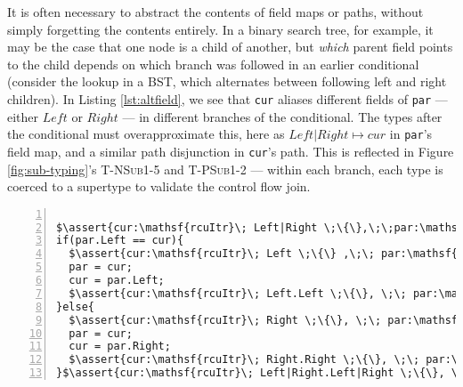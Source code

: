 It is often necessary to abstract the contents of field maps or paths, without simply forgetting the contents entirely.  In a binary search tree, for example, it may be the case that one node is a child of another, but \emph{which} parent field points to the child depends on which branch was followed in an earlier conditional (consider the lookup in a BST, which alternates between following left and right children).
In Listing \ref{lst:altfield}, we see that \texttt{cur} aliases different fields of \texttt{par} --- either $Left$ or $Right$ --- in different branches of the conditional.
The types after the conditional must overapproximate this, here as $Left|Right\mapsto cur$ in \texttt{par}'s field map, and a similar path disjunction in \texttt{cur}'s path.
This is reflected in Figure \ref{fig:sub-typing}'s \textsc{T-NSub1-5} and \textsc{T-PSub1-2} --- within each branch, each type is coerced to a supertype to validate the control flow join.
\begin{lstlisting}[caption={Choosing fields to read},label={lst:altfield},numbersep=1pt,xrightmargin=-1cm,xleftmargin=0.7em, numbers=left, numbersep=5pt,basicstyle=\scriptsize\ttfamily]%, ]

$\assert{cur:\mathsf{rcuItr}\; Left|Right \;\{\},\;\;par:\mathsf{rcuItr}\;  \epsilon \;\{Left|Right\mapsto cur\}}$
if(par.Left == cur){
  $\assert{cur:\mathsf{rcuItr}\; Left \;\{\} ,\;\; par:\mathsf{rcuItr}\;  \epsilon \;\{Left\mapsto cur\}}$
  par = cur;
  cur = par.Left;
  $\assert{cur:\mathsf{rcuItr}\; Left.Left \;\{\}, \;\; par:\mathsf{rcuItr}\;  Left \;\{Left\mapsto cur\}}$
}else{
  $\assert{cur:\mathsf{rcuItr}\; Right \;\{\}, \;\; par:\mathsf{rcuItr}\;  \epsilon \;\{Right\mapsto cur\}}$
  par = cur;
  cur = par.Right;
  $\assert{cur:\mathsf{rcuItr}\; Right.Right \;\{\}, \;\; par:\mathsf{rcuItr}\;  Right \;\{Right\mapsto cur\}}$
}$\assert{cur:\mathsf{rcuItr}\; Left|Right.Left|Right \;\{\}, \;\; par:\mathsf{rcuItr}\;  Left|Right \;\{Left|Right\mapsto cur\}}$
\end{lstlisting}

